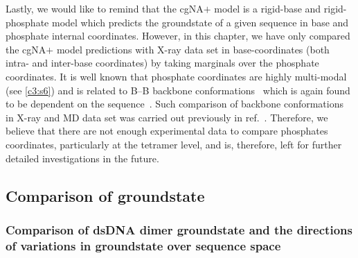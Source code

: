 Lastly, we would like to remind that the cgNA$+$ model is a rigid-base and rigid-phosphate model which predicts the groundstate of a given sequence in base and phosphate internal coordinates.
However, in this chapter, we have only compared the cgNA$+$ model predictions with X-ray data set in base-coordinates (both intra- and inter-base coordinates) by taking marginals over the phosphate coordinates.
It is well known that phosphate coordinates are highly multi-modal (see \cref{c3:s6}) and is related to B--B backbone conformations~\cite{hartmann1993b,dans2019static} which is again found to be dependent on the sequence~\cite{dans2019static}.
Such comparison of backbone conformations in X-ray and MD data set was carried out previously in ref.~\cite{madhumalar2005sequence}.
Therefore, we believe that there are not enough experimental data to compare phosphates coordinates, particularly at the tetramer level, and is, therefore, left for further detailed investigations in the future.

\subsection{Comparison of groundstate}

\subsubsection{Comparison of dsDNA dimer groundstate and the directions of variations in groundstate over sequence space}
\label{ss:comp_avg_shape_direc}

